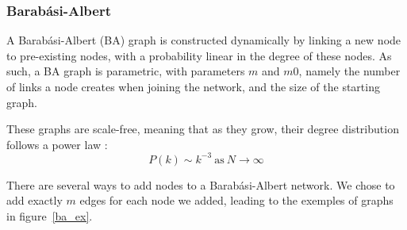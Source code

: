 \documentclass[10pt,a4paper]{scrartcl}
\begin{document}
\subsubsection{Barabási-Albert}
A Barabási-Albert (BA) graph is constructed dynamically by linking a new node to pre-existing nodes, with a probability linear in the degree of these nodes. As such, a BA graph is parametric, with parameters $m$ and $m0$, namely the number of links a node creates when joining the network, and the size of the starting graph.

These graphs are scale-free, meaning that as they grow, their degree distribution follows a power law :
$$P(k) \sim k^{-3}~\text{as}~N\rightarrow \infty$$

There are several ways to add nodes to a Barabási-Albert network. We chose to add exactly $m$ edges for each node we added, leading to the exemples of graphs in figure~\ref{ba_ex}.
\end{document}
